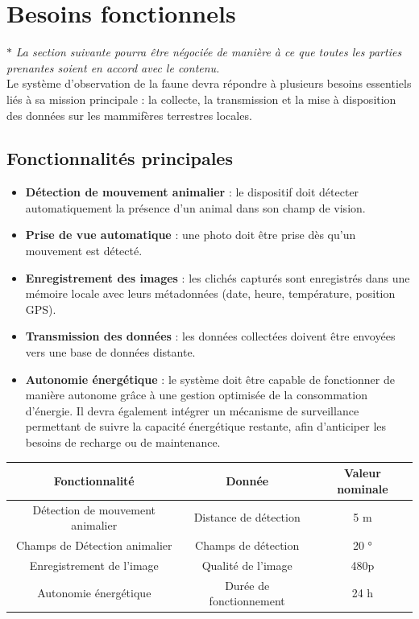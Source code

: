 \section{Besoins fonctionnels}

$ \ast $ \textit{La section suivante pourra être négociée de manière à ce que toutes les parties prenantes soient en accord avec le contenu.} \\

Le système d’observation de la faune devra répondre à plusieurs besoins essentiels liés à sa mission principale : la collecte, la transmission et la mise à disposition des données sur les mammifères terrestres locales.
\small
  \subsection{Fonctionnalités principales}
  \begin{itemize}
     \item \textbf{Détection de mouvement animalier} : le dispositif doit détecter automatiquement la présence d’un animal dans son champ de vision.
     \item \textbf{Prise de vue automatique} : une photo doit être prise dès qu’un mouvement est détecté.
     \item \textbf{Enregistrement des images} : les clichés capturés sont enregistrés dans une mémoire locale avec leurs métadonnées (date, heure, température, position GPS).
     \item \textbf{Transmission des données} : les données collectées doivent être envoyées vers une base de données distante.
     \item \textbf{Autonomie énergétique} : le système doit être capable de fonctionner de manière autonome grâce à une gestion optimisée de la consommation d’énergie. Il devra également intégrer un mécanisme de surveillance permettant de suivre la capacité énergétique restante, afin d’anticiper les besoins de recharge ou de maintenance.
  \end{itemize}


  \begin{center}
     \begin{tabular}{ | c || c | c | }
        \hline
        \textbf{Fonctionnalité} & \textbf{Donnée} & \textbf{Valeur nominale} \\ \hline
        Détection de mouvement animalier & Distance de détection & 5 m \\ \hline
        Champs de Détection animalier & Champs de détection & 20 ° \\ \hline
        Enregistrement de l'image & Qualité de l'image & 480p \\ \hline
        Autonomie énergétique & Durée de fonctionnement & 24 h  \\ \hline
     \end{tabular}
  \end{center}


